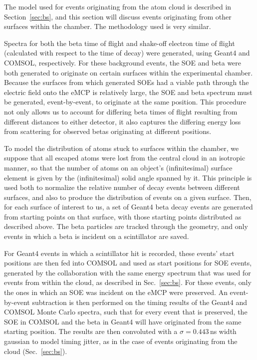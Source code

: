 The model used for events originating from the atom cloud is described in Section~\ref{sec:bs}, and this section will discuss events originating from other surfaces within the chamber.  The methodology used is very similar.  

Spectra for both the beta time of flight and shake-off electron time of flight (calculated with respect to the time of decay) were generated, using Geant4 and COMSOL, respectively.  For these background events, the SOE and beta were both generated to originate on certain surfaces within the experimental chamber.  Because the surfaces from which generated SOEs had a viable path through the electric field onto the eMCP is relatively large, the SOE and beta spectrum must be generated, event-by-event, to originate at the same position.  This procedure not only allows us to account for differing beta times of flight resulting from different distances to either detector, it also captures the differing energy loss from scattering for observed betas originating at different positions.

To model the distribution of atoms stuck to surfaces within the chamber, we suppose that all escaped atoms were lost from the central cloud in an isotropic manner, so that the number of atoms on an object's (infinitesimal) surface element is given by the (infinitesimal) solid angle spanned by it.  This principle is used both to normalize the relative number of decay events between different surfaces, and also to produce the distribution of events on a given surface.  Then, for each surface of interest to us, a set of Geant4 beta decay events are generated from starting points on that surface, with those starting points distributed as described above.  The beta particles are tracked through the geometry, and only events in which a beta is incident on a scintillator are saved.

For Geant4 events in which a scintillator hit is recorded, these events' start positions are then fed into COMSOL and used as start positions for SOE events, generated by the collaboration with the same energy spectrum that was used for events from within the cloud, as described in Sec.~\ref{sec:bs}.  %
For these events, only the ones in which an SOE was incident on the eMCP were preserved.  
An event-by-event subtraction is then performed on the timing results of the Geant4 and COMSOL Monte Carlo spectra, such that for every event that is preserved, the SOE in COMSOL and the beta in Geant4 will have originated from the same starting position.  The results are then convoluted with a $\sigma=0.443\,$ns width gaussian to model timing jitter, as in the case of events originating from the cloud (Sec.~\ref{sec:bs}).  

